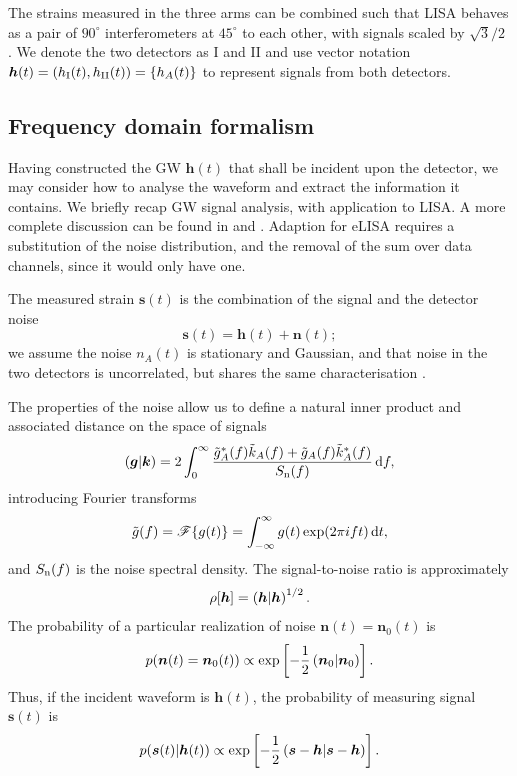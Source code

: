 The strains measured in the three arms can be combined such that LISA behaves as a pair of $90^{\circ}$ interferometers at $45^{\circ}$ to each other, with signals scaled by ${\sqrt{3}}/{2}$ \citep{Cutler1998}. We denote the two detectors as I and II and use vector notation $\boldsymbol{h}(t) = \left(h_\mathrm{I}(t), h_\mathrm{II}(t)\right) = \left\{h_A(t)\right\}$ to represent signals from both detectors.

\subsection{Frequency domain formalism}

Having constructed the GW $\boldsymbol{h}(t)$ that shall be incident upon the detector, we may consider how to analyse the waveform and extract the information it contains. We briefly recap GW signal analysis, with application to LISA. A more complete discussion can be found in \citet{Finn1992} and \citet{Cutler1994}. Adaption for eLISA requires a substitution of the noise distribution, and the removal of the sum over data channels, since it would only have one.

The measured strain $\boldsymbol{s}(t)$ is the combination of the signal and the detector noise
\begin{equation}
\boldsymbol{s}(t) = \boldsymbol{h}(t) + \boldsymbol{n}(t);
\end{equation}
we assume the noise $n_A(t)$ is stationary and Gaussian, and that noise in the two detectors is uncorrelated, but shares the same characterisation \citep{Cutler1998}.

The properties of the noise allow us to define a natural inner product and associated distance on the space of signals \citep{Cutler1994}
\begin{equation}
\left({\boldsymbol{g}}\middle|{\boldsymbol{k}}\right) = 2\int_{0}^{\infty}{\frac{\tilde{g}_A^\ast(f)\tilde{k}_A(f) + \tilde{g}_A(f)\tilde{k}_A^\ast(f)}{S_\mathrm{n}(f)}}\,\mathrm{d}{f},
\label{eq:inner}
\end{equation}
introducing Fourier transforms
\begin{equation}
\tilde{g}(f) = \mathscr{F}\{g(t)\} = \int_{-\infty}^{\infty}{g(t)\exp(2\pi i ft)}\,\mathrm{d}{t},
\end{equation}
and $S_\mathrm{n}(f)$ is the noise spectral density. The signal-to-noise ratio is approximately
\begin{equation}
\rho[\boldsymbol{h}] = \left({\boldsymbol{h}}\middle|{\boldsymbol{h}}\right)^{1/2}.
\label{eq:SNR}
\end{equation}
The probability of a particular realization of noise $\boldsymbol{n}(t) = \boldsymbol{n}_0(t)$ is
\begin{equation}
p(\boldsymbol{n}(t) = \boldsymbol{n}_0(t)) \propto \exp\left[-\frac{1}{2}\left({\boldsymbol{n}_0}\middle|{\boldsymbol{n}_0}\right)\right].
\end{equation}
Thus, if the incident waveform is $\boldsymbol{h}(t)$, the probability of measuring signal $\boldsymbol{s}(t)$ is
\begin{equation}
p(\boldsymbol{s}(t)|\boldsymbol{h}(t)) \propto \exp\left[-\frac{1}{2}\left({\boldsymbol{s}-\boldsymbol{h}}\middle|{\boldsymbol{s}-\boldsymbol{h}}\right)\right].
\label{eq:sig_prob}
\end{equation}

